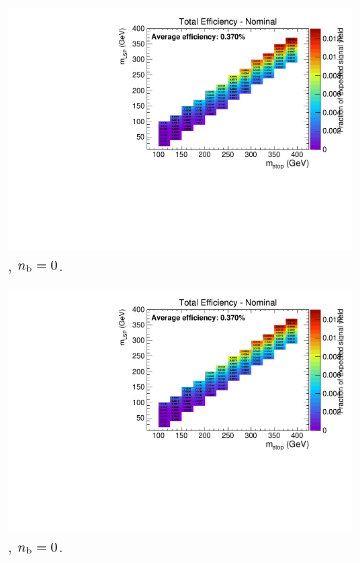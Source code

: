 \begin{figure}[ht!]
  \centering
  \begin{subfigure}[b]{0.32\textwidth}
    \includegraphics[width=\textwidth, page=4]{Figs/sms/t2degen/v5/ISR_T2_4body_v5_eq0b_le3j_incl.pdf}
    \caption{\njlow, $n_{\text{b}} = 0$.}
  \end{subfigure}
  \begin{subfigure}[b]{0.32\textwidth}
    \includegraphics[width=\textwidth, page=5]{Figs/sms/t2degen/v5/ISR_T2_4body_v5_eq0b_le3j_incl.pdf}
    \caption{\njlow, $n_{\text{b}} = 0$.}
  \end{subfigure}
  \begin{subfigure}[b]{0.32\textwidth}

\end{subfigure}
\end{figure}
